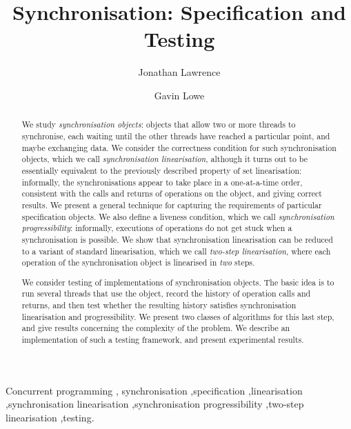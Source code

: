 \begin{frontmatter}
\title{Synchronisation: Specification and Testing}

\author{Jonathan Lawrence}

\author{Gavin Lowe}


\begin{abstract}
We study \emph{synchronisation objects}: objects that allow two or more
threads to synchronise, each waiting until the other threads have reached a
particular point, and maybe exchanging data.  We consider the correctness
condition for such synchronisation objects, which we call
\emph{synchronisation linearisation}, although it turns out to be essentially
equivalent to the previously described property of set linearisation:
informally, the synchronisations appear to take place in a one-at-a-time
order, consistent with the calls and returns of operations on the object, and
giving correct results.  We present a general technique for capturing the
requirements of particular specification objects.  We also define a liveness
condition, which we call \emph{synchronisation progressibility}: informally,
executions of operations do not get stuck when a synchronisation is possible.
We show that synchronisation linearisation can be reduced to a variant of
standard linearisation, which we call \emph{two-step linearisation}, where
each operation of the synchronisation object is linearised in \emph{two}
steps.

We consider testing of implementations of synchronisation objects.  The basic
idea is to run several threads that use the object, record the history of
operation calls and returns, and then test whether the resulting history
satisfies synchronisation linearisation and progressibility.  We present two
classes of algorithms for this last step, and give results concerning the
complexity of the problem.  We describe an implementation of such a testing
framework, and present experimental results.
\end{abstract}

\begin{keyword}
Concurrent programming \sep
synchronisation \sep specification \sep linearisation \sep synchronisation
linearisation \sep synchronisation progressibility \sep two-step linearisation
\sep testing.
\end{keyword}
\end{frontmatter}

